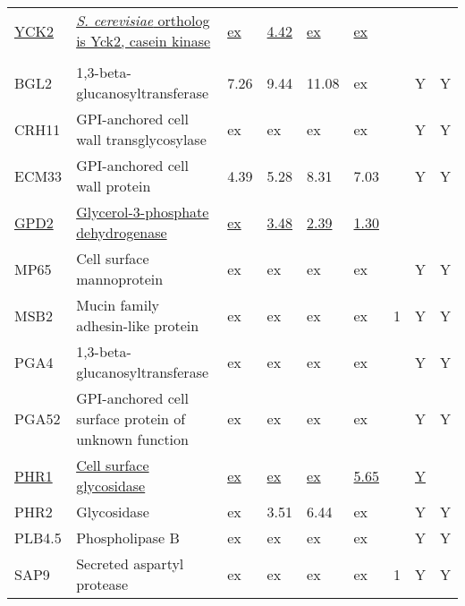 \begin{ThreePartTable}
\begin{longtable}[t]{lllllllll}
\hspace{1em}\underline{YCK2} & \underline{\textit{S. cerevisiae} ortholog is Yck2, casein kinase} & \underline{ex} & \underline{4.42} & \underline{ex} & \underline{ex} & \underline{} & \underline{} & \underline{}\\
\addlinespace[0.3em]
\multicolumn{9}{l}{\textbf{Cell wall, cell surface}}\\
\hspace{1em}BGL2 & 1,3-beta-glucanosyltransferase & 7.26 & 9.44 & 11.08 & ex &  & Y & Y\\
\hspace{1em}CRH11 & GPI-anchored cell wall transglycosylase & ex & ex & ex & ex &  & Y & Y\\
\hspace{1em}ECM33 & GPI-anchored cell wall protein & 4.39 & 5.28 & 8.31 & 7.03 &  & Y & Y\\
\hspace{1em}\underline{GPD2} & \underline{Glycerol-3-phosphate dehydrogenase} & \underline{ex} & \underline{3.48} & \underline{2.39} & \underline{1.30} & \underline{} & \underline{} & \underline{}\\
\hspace{1em}MP65 & Cell surface mannoprotein & ex & ex & ex & ex &  & Y & Y\\
\hspace{1em}MSB2 & Mucin family adhesin-like protein & ex & ex & ex & ex & 1 & Y & Y\\
\hspace{1em}PGA4 & 1,3-beta-glucanosyltransferase & ex & ex & ex & ex &  & Y & Y\\
\hspace{1em}PGA52 & GPI-anchored cell surface protein of unknown function & ex & ex & ex & ex &  & Y & Y\\
\hspace{1em}\underline{PHR1} & \underline{Cell surface glycosidase} & \underline{ex} & \underline{ex} & \underline{ex} & \underline{5.65} & \underline{} & \underline{Y} & \underline{}\\
\hspace{1em}PHR2 & Glycosidase & ex & 3.51 & 6.44 & ex &  & Y & Y\\
\hspace{1em}PLB4.5 & Phospholipase B & ex & ex & ex & ex &  & Y & Y\\
\hspace{1em}SAP9 & Secreted aspartyl protease & ex & ex & ex & ex & 1 & Y & Y\\

\end{longtable}
\end{ThreePartTable}
